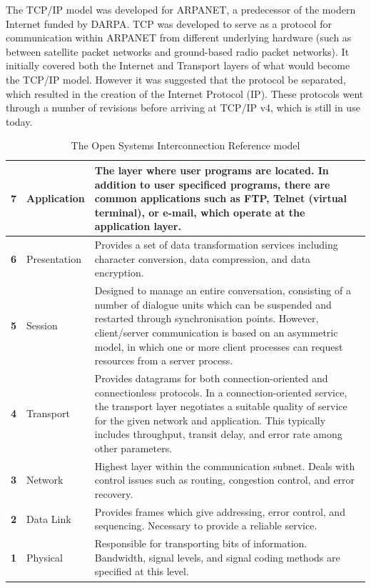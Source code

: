 The TCP/IP model was developed for ARPANET, a predecessor of the modern Internet funded by DARPA. TCP was developed to serve as a protocol for communication within ARPANET from different underlying hardware (such as between satellite packet networks and ground-based radio packet networks). It initially covered both the Internet and Transport layers of what would become the TCP/IP model. However it was suggested that the protocol be separated, which resulted in the creation of the Internet Protocol (IP). These protocols went through a number of revisions before arriving at TCP/IP v4, which is still in use today.

\begin{table}[!ht]
  \begin{center}
    \begin{tabularx}{\textwidth}{|c|l|X|}
      \hline
      \textbf{7} & Application & The layer where user programs are located. In addition to user specificed programs, there are common applications such as FTP, Telnet (virtual terminal), or e-mail, which operate at the application layer. \\ \hline
      \textbf{6} & Presentation & Provides a set of data transformation services including character conversion, data compression, and data encryption. \\ \hline
      \textbf{5} & Session & Designed to manage an entire conversation, consisting of a number of dialogue units which can be suspended and restarted through synchronisation points. However, \mbox{client/}server communication is based on an asymmetric model, in which one or more client processes can request resources from a server process. \\ \hline
      \textbf{4} & Transport & Provides datagrams for both connection-oriented and connectionless protocols. In a connection-oriented service, the transport layer negotiates a suitable quality of service for the given network and application. This typically includes throughput, transit delay, and error rate among other parameters. \\ \hline
      \textbf{3} & Network & Highest layer within the communication subnet. Deals with control issues such as routing, congestion control, and error recovery. \\ \hline
      \textbf{2} & Data Link & Provides frames which give addressing, error control, and sequencing. Necessary to provide a reliable service. \\ \hline
      \textbf{1} & Physical & Responsible for transporting bits of information. Bandwidth, signal levels, and signal coding methods are specified at this level. \\ \hline
    \end{tabularx}
  \end{center}
\caption{The Open Systems Interconnection Reference model \cite{networks01}}
\label{osi_model}
\end{table}


